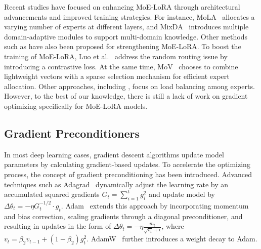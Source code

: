 Recent studies have focused on enhancing MoE-LoRA through architectural advancements and improved training strategies. For instance, MoLA~\cite{mola} allocates a varying number of experts at different layers, and MixDA~\cite{mixda} introduces multiple domain-adaptive modules to support multi-domain knowledge. Other methods such as \cite{moslora, MOElora, mole, mocle, adamix} have also been proposed for strengthening MoE-LoRA. To boost the training of MoE-LoRA, Luo et al.~\cite{MoEloraa} address the random routing issue by introducing a contrastive loss. At the same time, MoV~\cite{mov} chooses to combine lightweight vectors with a sparse selection mechanism for efficient expert allocation. Other approaches, including \cite{loramoe, mixlora, sira}, focus on load balancing among experts. However, to the best of our knowledge, there is still a lack of work on gradient optimizing specifically for MoE-LoRA models. 

\subsection{Gradient Preconditioners}
In most deep learning cases, gradient descent algorithms update model parameters by calculating gradient-based updates. To accelerate the optimizing process, the concept of gradient preconditioning has been introduced. Advanced techniques such as Adagrad~\cite{adagrad} dynamically adjust the learning rate by an accumulated squared gradients \( G_t = \sum_{i=1}^{t} g_i^2 \) and update model by \( \Delta \theta_t = -\eta G_t^{-1/2} \cdot g_t \). Adam~\cite{adam} extends this approach by incorporating momentum and bias correction, scaling gradients through a diagonal preconditioner, and resulting in updates in the form of \( \Delta \theta_t = -\eta \frac{m_t}{\sqrt{v_t} + \epsilon} \), where \( v_t = \beta_2 v_{t-1} + (1 - \beta_2) g_t^2 \). AdamW~\cite{adamw} further introduces a weight decay to Adam. 

